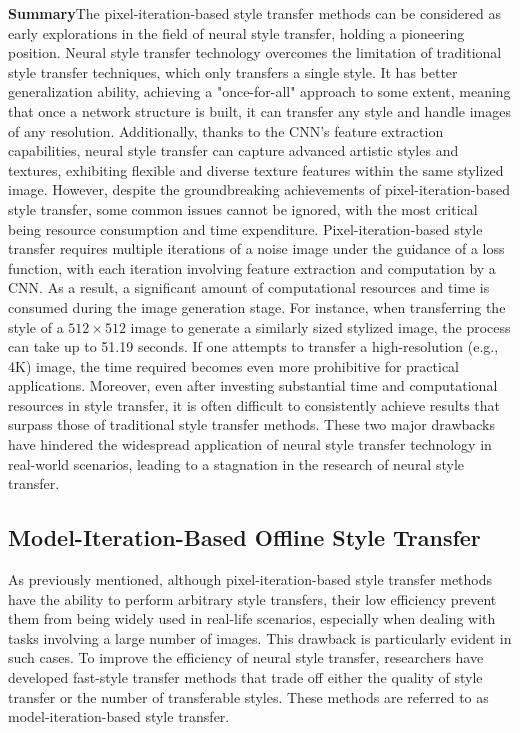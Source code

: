 \documentclass[preprint,12pt]{elsarticle}
\begin{document}
\textbf{Summary}\quad The pixel-iteration-based style transfer methods can be considered as early explorations in the field of neural style transfer, holding a pioneering position.
Neural style transfer technology overcomes the limitation of traditional style transfer techniques, which only transfers a single style. It has better generalization ability, achieving a "once-for-all" approach to some extent, meaning that once a network structure is built, it can transfer any style and handle images of any resolution. Additionally, thanks to the CNN's feature extraction capabilities, neural style transfer can capture advanced artistic styles and textures, exhibiting flexible and diverse texture features within the same stylized image.
However, despite the groundbreaking achievements of pixel-iteration-based style transfer, some common issues cannot be ignored, with the most critical being resource consumption and time expenditure. Pixel-iteration-based style transfer requires multiple iterations of a noise image under the guidance of a loss function, with each iteration involving feature extraction and computation by a CNN. As a result, a significant amount of computational resources and time is consumed during the image generation stage. For instance, when transferring the style of a $512\times 512$ image to generate a similarly sized stylized image, the process can take up to 51.19 seconds\citep{01jing2019neural}. If one attempts to transfer a high-resolution (e.g., 4K) image, the time required becomes even more prohibitive for practical applications.
Moreover, even after investing substantial time and computational resources in style transfer, it is often difficult to consistently achieve results that surpass those of traditional style transfer methods.
These two major drawbacks have hindered the widespread application of neural style transfer technology in real-world scenarios, leading to a stagnation in the research of neural style transfer. 

\subsection{Model-Iteration-Based Offline Style Transfer}

As previously mentioned, although pixel-iteration-based style transfer methods have the ability to perform arbitrary style transfers, their low efficiency prevent them from being widely used in real-life scenarios, especially when dealing with tasks involving a large number of images. This drawback is particularly evident in such cases. To improve the efficiency of neural style transfer, researchers have developed fast-style transfer methods that trade off either the quality of style transfer or the number of transferable styles. These methods are referred to as model-iteration-based style transfer.
\end{document}
